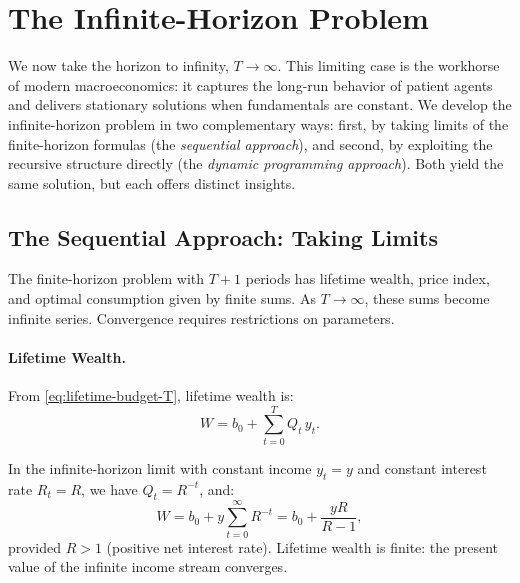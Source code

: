 \section{The Infinite-Horizon Problem}
\label{sec:infinite-horizon}

We now take the horizon to infinity, $T \to \infty$. This limiting case is the workhorse of modern macroeconomics: it captures the long-run behavior of patient agents and delivers stationary solutions when fundamentals are constant. We develop the infinite-horizon problem in two complementary ways: first, by taking limits of the finite-horizon formulas (the \emph{sequential approach}), and second, by exploiting the recursive structure directly (the \emph{dynamic programming approach}). Both yield the same solution, but each offers distinct insights.

\subsection{The Sequential Approach: Taking Limits}
\label{subsec:sequential-infinity}

The finite-horizon problem with $T+1$ periods has lifetime wealth, price index, and optimal consumption given by finite sums. As $T \to \infty$, these sums become infinite series. Convergence requires restrictions on parameters.

\paragraph{Lifetime Wealth.}
From \cref{eq:lifetime-budget-T}, lifetime wealth is:
\begin{equation}
W = b_0 + \sum_{t=0}^{T} Q_t \, y_t.
\label{eq:wealth-T-recall}
\end{equation}

In the infinite-horizon limit with constant income $y_t = y$ and constant interest rate $R_t = R$, we have $Q_t = R^{-t}$, and:
\begin{equation}
W = b_0 + y \sum_{t=0}^{\infty} R^{-t} = b_0 + \frac{yR}{R - 1},
\label{eq:wealth-infinity}
\end{equation}
provided $R > 1$ (positive net interest rate). Lifetime wealth is finite: the present value of the infinite income stream converges.

